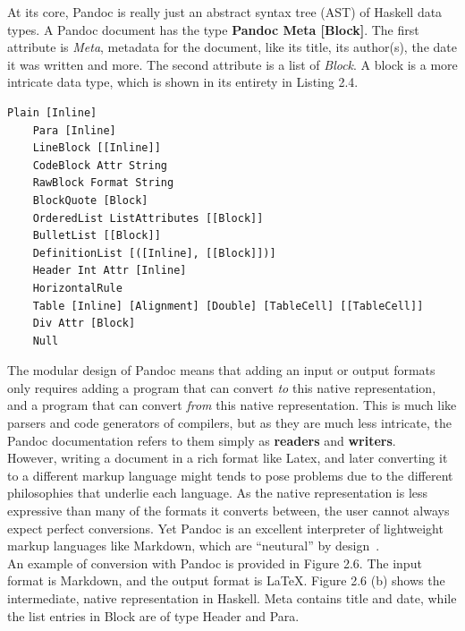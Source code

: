 At its core, Pandoc is really just an abstract syntax tree (AST) of Haskell data types. A Pandoc document has the type \textbf{Pandoc Meta [Block]}. The first attribute is \textit{Meta}, metadata for the document, like its title, its author(s), the date it was written and more. The second attribute is a list of \textit{Block}. A block is a more intricate data type, which is shown in its entirety in Listing 2.4.

\begin{lstlisting}[caption={The ``Block'' data type of Pandocs native representation}, captionpos=b]
    Plain [Inline]
    Para [Inline]
    LineBlock [[Inline]]
    CodeBlock Attr String
    RawBlock Format String
    BlockQuote [Block]
    OrderedList ListAttributes [[Block]]
    BulletList [[Block]]
    DefinitionList [([Inline], [[Block]])]
    Header Int Attr [Inline]
    HorizontalRule
    Table [Inline] [Alignment] [Double] [TableCell] [[TableCell]]
    Div Attr [Block]
    Null    
\end{lstlisting}

The modular design of Pandoc means that adding an input or output formats only requires adding a program that can convert \textit{to} this native representation, and a program that can convert \textit{from} this native representation. This is much like parsers and code generators of compilers, but as they are much less intricate, the Pandoc documentation refers to them simply as \textbf{readers} and \textbf{writers}. \hfill \\

However, writing a document in a rich format like Latex, and later converting it to a different markup language might tends to pose problems due to the different philosophies that underlie each language. As the native representation is less expressive than many of the formats it converts between, the user cannot always expect perfect conversions. Yet Pandoc is an excellent interpreter of lightweight markup languages like Markdown, which are ``neutural'' by design~\cite{dominici2014}. \hfill \\

An example of conversion with Pandoc is provided in Figure 2.6. The input format is Markdown, and the output format is LaTeX. Figure 2.6 (b) shows the intermediate, native representation in Haskell. Meta contains title and date, while the list entries in Block are of type Header and Para. \hfill \\

